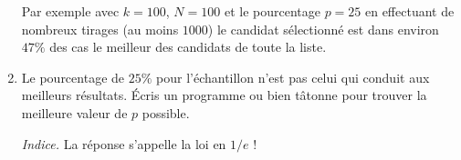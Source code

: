 \documentclass[11pt,class=report,crop=false]{standalone}
\begin{document}
\begin{activite}
\begin{enumerate}
	Par exemple avec $k=100$, $N=100$ et le pourcentage $p=25$ en effectuant de nombreux tirages (au moins $1000$) le candidat sélectionné est dans environ $47\%$ des cas le meilleur des candidats de toute la liste.
	
	\item Le pourcentage de $25\%$ pour l'échantillon n'est pas celui qui conduit aux meilleurs résultats. \'Ecris un programme ou bien tâtonne pour trouver la meilleure valeur de $p$ possible.
	
	\emph{Indice.} La réponse s'appelle la loi en $1/e$ !
\end{enumerate}
	
\end{activite}



\end{document}
